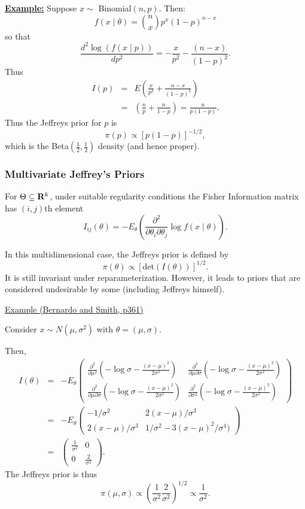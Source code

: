 \documentclass[12pt]{article}
\def\ni{\noindent}
\begin{document}
\vskip 6mm
\ni\underline{\bf Example:}
\vskip 4mm
Suppose $x\sim$ Binomial$(n,p)$.  Then:
$$f(x\mid \theta)={n \choose x}p^x (1-p)^{n-x}$$
so that
$$\frac{d^2 \log(f(x\mid p))}{dp^2}
=-\frac{x}{p^2} - \frac{(n-x)}{(1-p)^2}.$$
Thus
\begin{eqnarray*}
I(p)&=&E\left( \frac{x}{p^2} + \frac{n-x}{(1-p)^2} \right)\\
&=&\left( \frac{n}{p} + \frac{n}{1-p} \right) = \frac{n}{p(1-p)}.
\end{eqnarray*}
Thus the Jeffreys prior for $p$ is
$$\pi(p)\propto [p(1-p)]^{-1/2},
$$
which is the Beta$(\frac{1}{2},\frac{1}{2})$ density (and hence proper).
\vskip 8mm




\subsubsection{Multivariate Jeffrey's Priors}

For $\Theta \subseteq {\bf R}^k$, under suitable regularity conditions
the Fisher Information matrix has
$(i,j)$th element
$$I_{ij}(\theta)=-E_{\theta}\left( \frac{\partial^2}{\partial\theta_i \partial\theta_j}
  \log f(x\mid \theta) \right).$$

In this
multidimensional case, the Jeffreys prior is defined by
$$\pi(\theta)\propto [\mbox{det}(I(\theta))]^{1/2}.$$
It is still invariant under reparameterization.  
However, it leads to priors that are considered undesirable by some
(including Jeffreys himself).

\ni\underline{Example (Bernardo and Smith, p361)}

Consider $x\sim N(\mu, \sigma^2)$ with $\theta=(\mu, \sigma)$.

Then,
\begin{eqnarray*}
I(\theta)&=&-E_\theta \left(\begin{array}{ll}
 \frac{\partial^2}{\partial\mu^2}(-\log\sigma -\frac{(x-\mu)^2}{2\sigma^2})
 &\frac{\partial^2}{\partial\mu\partial\sigma}(-\log\sigma -\frac{(x-\mu)^2}{2\sigma^2})\\
\frac{\partial^2}{\partial\mu\partial\sigma}(-\log\sigma -\frac{(x-\mu)^2}{2\sigma^2})
&\frac{\partial^2}{\partial\sigma^2}(-\log\sigma -\frac{(x-\mu)^2}{2\sigma^2})
\end{array}\right)\\
&=& -E_\theta \left(\begin{array}{cl}
-1/\sigma^2 & 2(x-\mu)/\sigma^3\\
2(x-\mu)/\sigma^3 & 1/\sigma^2 - 3(x-\mu)^2/\sigma^4)
\end{array}\right)\\
&=&\left(\begin{array}{cc}
\frac{1}{\sigma^2}&0\\
0&\frac{2}{\sigma^2}
\end{array}\right).
\end{eqnarray*}
The Jeffreys prior is thus
$$
\pi(\mu,\sigma)\propto
\left(\frac{1}{\sigma^2}\frac{2}{\sigma^2}\right)^{1/2} \propto
\frac{1}{\sigma^2}.
$$
\end{document}
